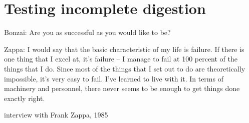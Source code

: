 \documentclass[a4paper,12pt,times,print,index,custombib,custommargin]{PhDThesisPSnPDF}\usepackage[]{graphicx}\usepackage[]{color}
\begin{document}
%
\tableofcontents
%


\listoftodos

\printglossaries



\ifpdf
    \graphicspath{
    {./Figs/Raster/}
    {./Figs/PDF/}
    {./Figs/}
    {/Users/Claudius/Documents/PhD/THESIS/kks32/LaTeX/Data_analysis/reference-mapping/figure/}
    {/Users/Claudius/Documents/PhD/THESIS/kks32/LaTeX/3_Chapter/Figs/}
    }
\else
    \graphicspath{ 
    {/Users/Claudius/Documents/PhD/THESIS/kks32/LaTeX/3_Chapter/Figs/}
    }
\fi



%
%
%
\chapter{Testing incomplete digestion}
%
%
%

%

\epigraph{
Bonzai: Are you as successful as you would like to be?

Zappa: I would say that the basic characteristic of my life is failure. 
If there is one thing that I excel at, it's failure -- I manage to fail at 100 percent of the things that I do. 
Since most of the things that I set out to do are theoretically impossible, it's very easy to fail. 
I've learned to live with it. 
In terms of machinery and personnel, there never seems to be enough to get things done exactly right.
}{interview with Frank Zappa, 1985}

\end{document}
